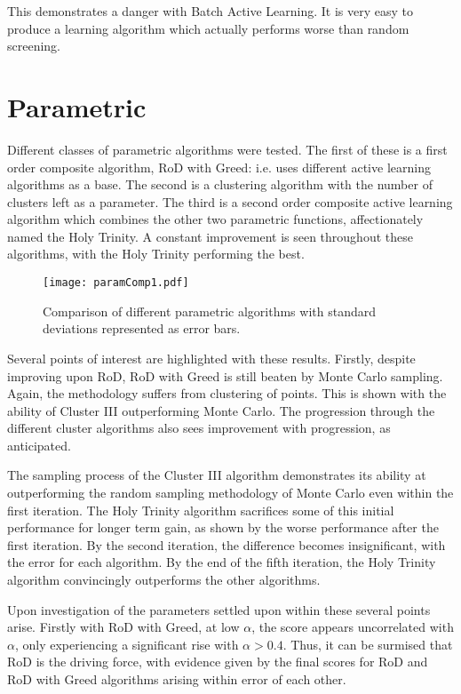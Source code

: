 This demonstrates a danger with Batch Active Learning. It is very easy to produce a learning algorithm which actually performs worse than random screening.

\section{Parametric}
Different classes of parametric algorithms were tested. The first of these is a first order composite algorithm, RoD with Greed: i.e. uses different active learning algorithms as a base. The second is a clustering algorithm with the number of clusters left as a parameter. The third is a second order composite active learning algorithm which combines the other two parametric functions, affectionately named the Holy Trinity. A constant improvement is seen throughout these algorithms, with the Holy Trinity performing the best.

\begin{figure}[h]
    \begin{center}
        \texttt{[image: paramComp1.pdf]}
        \caption[Non-parametric comparison]{Comparison of different parametric algorithms with standard deviations represented as error bars.}
        \label{fig:pComp}
    \end{center}
\end{figure}

Several points of interest are highlighted with these results. Firstly, despite improving upon RoD, RoD with Greed is still beaten by Monte Carlo sampling. Again, the methodology suffers from clustering of points. This is shown with the ability of Cluster III outperforming Monte Carlo. The progression through the different cluster algorithms also sees improvement with progression, as anticipated.

The sampling process of the Cluster III algorithm demonstrates its ability at outperforming the random sampling methodology of Monte Carlo even within the first iteration. The Holy Trinity algorithm sacrifices some of this initial performance for longer term gain, as shown by the worse performance after the first iteration. By the second iteration, the difference becomes insignificant, with the error for each algorithm. By the end of the fifth iteration, the Holy Trinity algorithm convincingly outperforms the other algorithms.

Upon investigation of the parameters settled upon within these several points arise. Firstly with RoD with Greed, at low $\alpha$, the score appears uncorrelated with $\alpha$, only experiencing a significant rise with $\alpha{}>0.4$. Thus, it can be surmised that RoD is the driving force, with evidence given by the final scores for RoD and RoD with Greed algorithms arising within error of each other.

